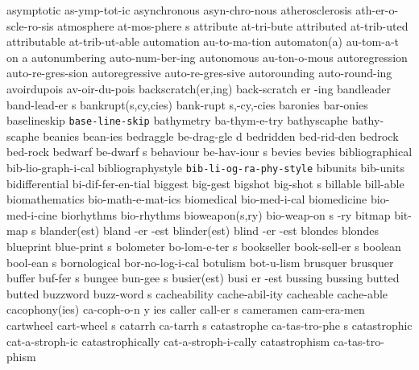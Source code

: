 \1 asymptotic		as-ymp-tot-ic
\1 asynchronous		asyn-chro-nous
\1 atherosclerosis	ath-er-o-scle-ro-sis
\5 atmosphere		at-mos-phere s
\1 attribute		at-tri-bute		%
\1 attributed		at-trib-uted
\1 attributable		at-trib-ut-able
\1 automation		au-to-ma-tion           %
\3 automaton(a)		au-tom-a-t on a         %
\1 autonumbering	auto-num-ber-ing	%
\1 autonomous		au-ton-o-mous		%
\1 autoregression	auto-re-gres-sion	%
\1 autoregressive	auto-re-gres-sive	%
\1 autorounding		auto-round-ing		%
\1 avoirdupois		av-oir-du-pois
\3 backscratch(er,ing)	back-scratch er -ing	%
\5 bandleader		band-lead-er s
\2 bankrupt(s,cy,cies)	bank-rupt s,-cy,-cies
\1 baronies		bar-onies
\1 baselineskip 	{\tt\bs base-line-skip}
\1 bathymetry		ba-thym-e-try
\1 bathyscaphe		bathy-scaphe
\1 beanies		bean-ies
\5 bedraggle		be-drag-gle d		%
\1 bedridden		bed-rid-den		%
\1 bedrock		bed-rock		%
\5 bedwarf		be-dwarf s		%
\5 behaviour		be-hav-iour s
\1 bevies		bevies
\1 bibliographical	bib-lio-graph-i-cal	%
\1 bibliographystyle	{\tt\bs bib-li-og-ra-phy-style}
\1 bibunits		bib-units       	%
\1 bidifferential	bi-dif-fer-en-tial
\1 biggest		big-gest
\5 bigshot		big-shot s		%
\1 billable		bill-able
\1 biomathematics	bio-math-e-mat-ics
\1 biomedical		bio-med-i-cal		%
\1 biomedicine		bio-med-i-cine
\1 biorhythms		bio-rhythms
\3 bioweapon(s,ry)	bio-weap-on s -ry	%
\5 bitmap		bit-map s
\3 blander(est)		bland -er -est
\3 blinder(est)		blind -er -est
\1 blondes		blondes
\5 blueprint		blue-print s
\5 bolometer		bo-lom-e-ter s
\5 bookseller		book-sell-er s		%
\5 boolean		bool-ean s		%
\1 bornological 	bor-no-log-i-cal
\1 botulism		bot-u-lism
\1 brusquer		brusquer
\5 buffer		buf-fer s		%
\5 bungee		bun-gee s		%
\3 busier(est)		busi er -est
\1 bussing		bussing
\1 butted		butted
\5 buzzword		buzz-word s
\1 cacheability 	cache-abil-ity		%
\1 cacheable	 	cache-able		%
\3 cacophony(ies)	ca-coph-o-n y ies
\5 caller		call-er s		%
\1 cameramen		cam-era-men
\5 cartwheel		cart-wheel s
\5 catarrh		ca-tarrh s
\NewWordtrue
\5 catastrophe		ca-tas-tro-phe s	%
\1 catastrophic		cat-a-stroph-ic
\1 catastrophically	cat-a-stroph-i-cally
\NewWordtrue
\1 catastrophism	ca-tas-tro-phism	%
